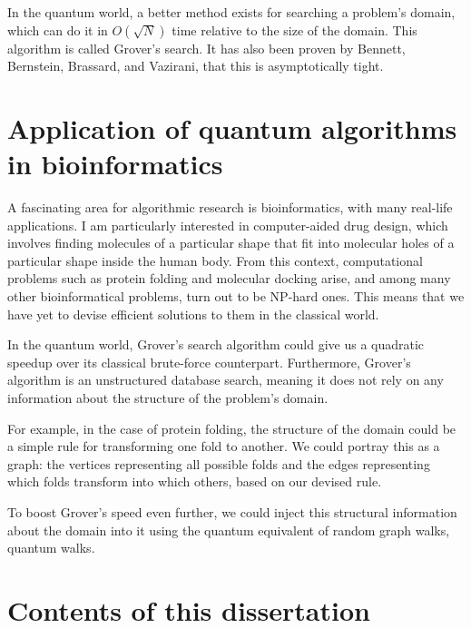 In the quantum world, a better method exists for searching a problem's domain, which can do it in $O(\sqrt{N})$ time relative to the size of the domain. This algorithm is called Grover's search. It has also been proven by Bennett, Bernstein, Brassard, and Vazirani, that this is asymptotically tight\cite{bennett_strengths_1997}.

\section{Application of quantum algorithms in bioinformatics}

A fascinating area for algorithmic research is bioinformatics, with many real-life applications. I am particularly interested in computer-aided drug design, which involves finding molecules of a particular shape that fit into molecular holes of a particular shape inside the human body. From this context, computational problems such as protein folding\cite{crescenzi_complexity_1998} and molecular docking\cite{a_molecular_2018} arise, and among many other bioinformatical problems, turn out to be NP-hard ones. This means that we have yet to devise efficient solutions to them in the classical world.

In the quantum world, Grover's search algorithm could give us a quadratic speedup over its classical brute-force counterpart. Furthermore, Grover's algorithm is an unstructured database search, meaning it does not rely on any information about the structure of the problem's domain.

For example, in the case of protein folding, the structure of the domain could be a simple rule for transforming one fold to another. We could portray this as a graph: the vertices representing all possible folds and the edges representing which folds transform into which others, based on our devised rule.

To boost Grover's speed even further, we could inject this structural information about the domain into it using the quantum equivalent of random graph walks, quantum walks.

\section{Contents of this dissertation}

